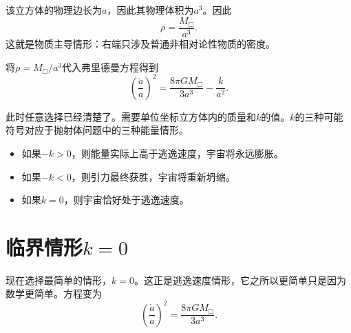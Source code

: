 
该立方体的物理边长为\(a\)，因此其物理体积为\(a^3\)。因此
\begin{equation}
\rho=\frac{M_{\Box}}{a^3}.
\end{equation}
这就是物质主导情形：右端只涉及普通非相对论性物质的密度。

\begin{classroomqa}
\end{classroomqa}

将\(\rho=M_{\Box}/a^3\)代入弗里德曼方程得到
\begin{equation}
\left(\frac{\dot a}{a}\right)^2=\frac{8\pi G M_{\Box}}{3a^3}-\frac{k}{a^2}.
\end{equation}

此时任意选择已经清楚了。需要单位坐标立方体内的质量和\(k\)的值。\(k\)的三种可能符号对应于抛射体问题中的三种能量情形。

\begin{itemize}
\item 如果\(-k>0\)，则能量实际上高于逃逸速度，宇宙将永远膨胀。
\item 如果\(-k<0\)，则引力最终获胜，宇宙将重新坍缩。
\item 如果\(k=0\)，则宇宙恰好处于逃逸速度。
\end{itemize}

\begin{classroomqa}
\end{classroomqa}

\section{临界情形\(k=0\)}

现在选择最简单的情形，\(k=0\)。这正是逃逸速度情形，它之所以更简单只是因为数学更简单。方程变为
\begin{equation}
\left(\frac{\dot a}{a}\right)^2=\frac{8\pi G M_{\Box}}{3a^3}.
\end{equation}

